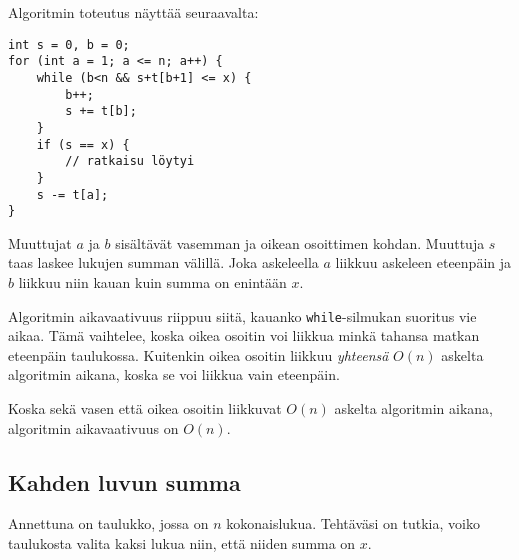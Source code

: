 \begin{center}
\end{center}

Algoritmin toteutus näyttää seuraavalta:

\begin{lstlisting}
int s = 0, b = 0;
for (int a = 1; a <= n; a++) {
    while (b<n && s+t[b+1] <= x) {
        b++;
        s += t[b];
    }
    if (s == x) {
        // ratkaisu löytyi
    }
    s -= t[a];
}
\end{lstlisting}

Muuttujat $a$ ja $b$ sisältävät vasemman ja oikean
osoittimen kohdan.
Muuttuja $s$ taas laskee lukujen summan välillä.
Joka askeleella $a$ liikkuu askeleen eteenpäin
ja $b$ liikkuu niin kauan kuin summa on enintään $x$.

Algoritmin aikavaativuus riippuu siitä,
kauanko \texttt{while}-silmukan suoritus vie aikaa.
Tämä vaihtelee, koska oikea osoitin voi liikkua
minkä tahansa matkan eteenpäin taulukossa.
Kuitenkin oikea osoitin liikkuu \textit{yhteensä}
$O(n)$ askelta algoritmin aikana, koska se voi
liikkua vain eteenpäin.

Koska sekä vasen että oikea osoitin liikkuvat
$O(n)$ askelta algoritmin aikana,
algoritmin aikavaativuus on $O(n)$.

\subsection{Kahden luvun summa}

\begin{task}
Annettuna on taulukko, jossa on $n$ kokonaislukua.
Tehtäväsi on tutkia, voiko taulukosta valita kaksi lukua
niin, että niiden summa on $x$.
\end{task}

